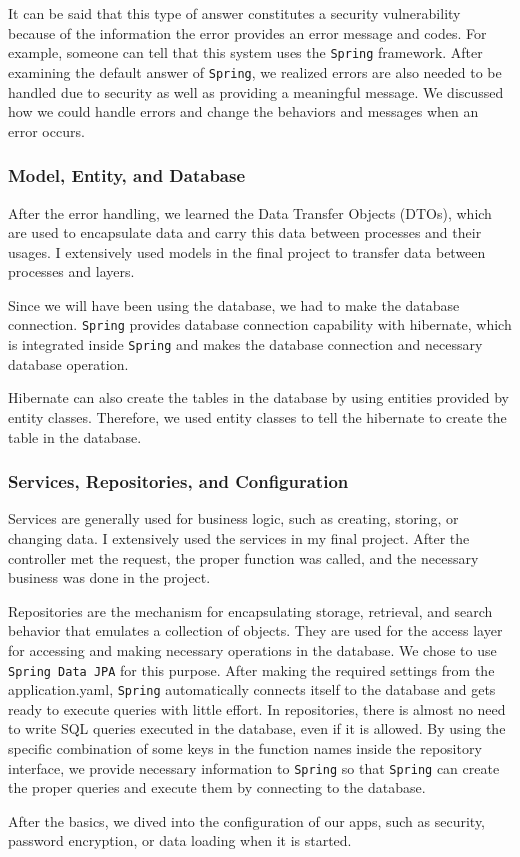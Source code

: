 It can be said that this type of answer constitutes a security vulnerability because of the information the error provides an error message and codes. For example, someone can tell that this system uses the \texttt{Spring} framework. After examining the default answer of \texttt{Spring}, we realized errors are also needed to be handled due to security as well as providing a meaningful message. We discussed how we could handle errors and change the behaviors and messages when an error occurs.

\subsubsection{Model, Entity, and Database}

After the error handling, we learned the Data Transfer Objects (DTOs), which are used to encapsulate data and carry this data between processes and their usages. I extensively used models in the final project to transfer data between processes and layers.

Since we will have been using the database, we had to make the database connection. \texttt{Spring} provides database connection capability with hibernate, which is integrated inside \texttt{Spring} and makes the database connection and necessary database operation. 

Hibernate can also create the tables in the database by using entities provided by entity classes. Therefore, we used entity classes to tell the hibernate to create the table in the database.

\subsubsection{Services, Repositories, and Configuration}

Services are generally used for business logic, such as creating, storing, or changing data. I extensively used the services in my final project. After the controller met the request, the proper function was called, and the necessary business was done in the project.

Repositories are the mechanism for encapsulating storage, retrieval, and search behavior that emulates a collection of objects. They are used for the access layer for accessing and making necessary operations in the database. We chose to use \texttt{Spring Data JPA} for this purpose. After making the required settings from the application.yaml, \texttt{Spring} automatically connects itself to the database and gets ready to execute queries with little effort. In repositories, there is almost no need to write SQL queries executed in the database, even if it is allowed. By using the specific combination of some keys in the function names inside the repository interface, we provide necessary information to \texttt{Spring} so that \texttt{Spring} can create the proper queries and execute them by connecting to the database.

After the basics, we dived into the configuration of our apps, such as security, password encryption, or data loading when it is started.
